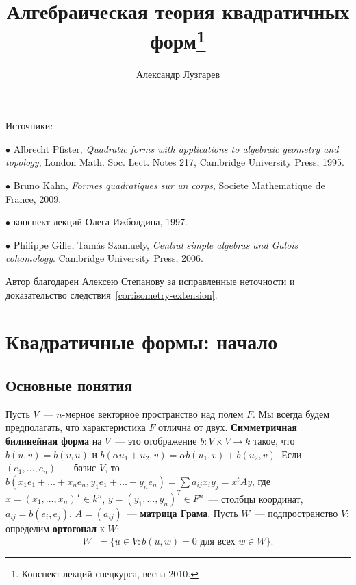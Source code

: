 \documentclass[a4paper,oneside,12pt]{article}
\theoremstyle{plain} { \swapnumbers
\newtheorem{theorem}{Теорема}[subsection]
\newtheorem{corollary}[theorem]{Следствие}
\newtheorem{lemma}[theorem]{Лемма}
\newtheorem{proposition}[theorem]{Утверждение}
\newtheorem{claim}[theorem]{Факт}
}
\theoremstyle{definition} { \swapnumbers
\newtheorem{definition}[theorem]{Определение}
\newtheorem{notation}[theorem]{Обозначение}
\newtheorem{remark}[theorem]{Замечание}
\newtheorem{remarks}[theorem]{Замечания}
\newtheorem{example}[theorem]{Пример}
\newtheorem{examples}[theorem]{Примеры}
\newtheorem{sssection}[theorem]{}
}
\def\a{\alpha}
\begin{document}
\frenchspacing
{}


\author{Александр Лузгарев}
\title{Алгебраическая теория квадратичных форм\thanks{Конспект лекций спецкурса, весна 2010.}}
\date{}

\maketitle

\tableofcontents
\newpage

Источники:
\par\noindent $\bullet$ Albrecht Pfister, {\it Quadratic forms with applications to algebraic geometry and topology},
London Math. Soc. Lect. Notes 217, Cambridge University Press, 1995.
\par\noindent $\bullet$ Bruno Kahn, {\it Formes quadratiques sur un corps},
Societe Mathematique de France, 2009.
\par\noindent $\bullet$ конспект лекций Олега Ижболдина, 1997.
\par\noindent $\bullet$ Philippe Gille, Tam\'as Szamuely, {\it Central simple algebras and Galois cohomology}.
Cam\-bridge University Press, 2006.

\bigskip
Автор благодарен Алексею Степанову за исправленные неточности и доказательство следствия~\ref{cor:isometry-extension}.

\section{Квадратичные формы: начало}

\subsection{Основные понятия}

\begin{definition}
Пусть $V$~--- $n$-мерное векторное пространство над полем $F$. Мы всегда
будем предполагать, что характеристика $F$ отлична от двух.
{\bf Симметричная билинейная форма} на $V$~--- это отображение
$b\colon V\times V\to k$ такое, что $b(u,v)=b(v,u)$ и $b(\a u_1+u_2,v)=\a b(u_1,v)+b(u_2,v)$.
Если $(e_1,\dots,e_n)$~--- базис $V$, то
$b(x_1e_1+\dots+x_ne_n,y_1e_1+\dots+y_ne_n)=\sum{a_{ij}x_iy_j}=x^tAy$,
где $x=(x_1,\dots,x_n)^T\in k^n$, $y=(y_1,\dots,y_n)^T\in F^n$~--- столбцы координат,
$a_{ij}=b(e_i,e_j)$, $A=(a_{ij})$~--- {\bf матрица Грама}.
Пусть $W$~--- подпространство $V$; определим {\bf ортогонал} к $W$:
$$
W^\perp=\{u\in V:b(u,w)=0\text{ для всех }w\in W\}.
$$
\end{definition}
\end{document}
